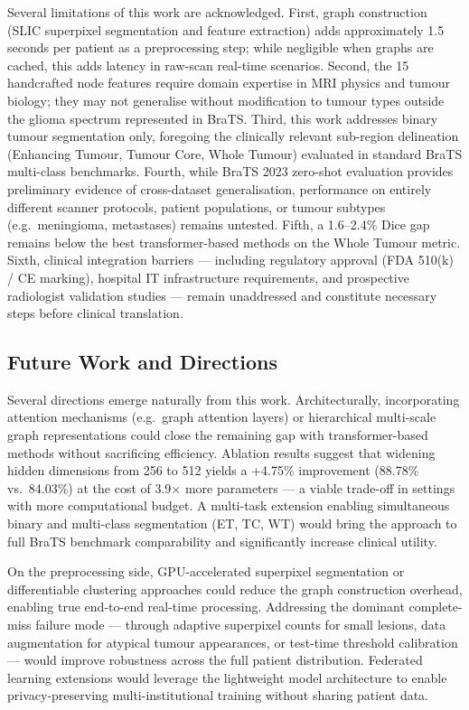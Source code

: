Several limitations of this work are acknowledged. First, graph construction (SLIC superpixel segmentation and feature extraction) adds approximately 1.5 seconds per patient as a preprocessing step; while negligible when graphs are cached, this adds latency in raw-scan real-time scenarios. Second, the 15 handcrafted node features require domain expertise in MRI physics and tumour biology; they may not generalise without modification to tumour types outside the glioma spectrum represented in BraTS. Third, this work addresses binary tumour segmentation only, foregoing the clinically relevant sub-region delineation (Enhancing Tumour, Tumour Core, Whole Tumour) evaluated in standard BraTS multi-class benchmarks. Fourth, while BraTS 2023 zero-shot evaluation provides preliminary evidence of cross-dataset generalisation, performance on entirely different scanner protocols, patient populations, or tumour subtypes (e.g.\ meningioma, metastases) remains untested. Fifth, a 1.6--2.4\% Dice gap remains below the best transformer-based methods on the Whole Tumour metric. Sixth, clinical integration barriers — including regulatory approval (FDA 510(k) / CE marking), hospital IT infrastructure requirements, and prospective radiologist validation studies — remain unaddressed and constitute necessary steps before clinical translation.


\subsection{Future Work and Directions}

Several directions emerge naturally from this work. Architecturally, incorporating attention mechanisms (e.g.\ graph attention layers) or hierarchical multi-scale graph representations could close the remaining gap with transformer-based methods without sacrificing efficiency. Ablation results suggest that widening hidden dimensions from 256 to 512 yields a +4.75\% improvement (88.78\% vs.\ 84.03\%) at the cost of 3.9$\times$ more parameters — a viable trade-off in settings with more computational budget. A multi-task extension enabling simultaneous binary and multi-class segmentation (ET, TC, WT) would bring the approach to full BraTS benchmark comparability and significantly increase clinical utility.

On the preprocessing side, GPU-accelerated superpixel segmentation or differentiable clustering approaches could reduce the graph construction overhead, enabling true end-to-end real-time processing. Addressing the dominant complete-miss failure mode — through adaptive superpixel counts for small lesions, data augmentation for atypical tumour appearances, or test-time threshold calibration — would improve robustness across the full patient distribution. Federated learning extensions would leverage the lightweight model architecture to enable privacy-preserving multi-institutional training without sharing patient data.

